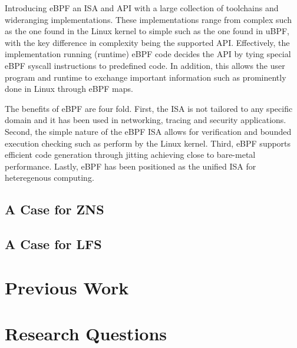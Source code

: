 \documentclass[conference]{IEEEtran}
\begin{document}
Introducing eBPF an ISA and API with a large collection of toolchains and
wideranging implementations\cite{what-ebpf, McCanne1993TheBP}. These
implementations range from complex such as the one found in the Linux kernel to
simple such as the one found in uBPF\cite{ubpf}, with the key difference in
complexity being the supported API. Effectively, the implementation running
(runtime) eBPF code decides the API by tying special eBPF syscall instructions
to predefined code. In addition, this allows the user program and runtime to
exchange important information such as prominently done in Linux through eBPF
maps\cite{bpf-man}.

The benefits of eBPF are four fold. First, the ISA is not tailored to any
specific domain and it has been used in networking\cite{xdp},
tracing\cite{enhanced-ebpf} and security\cite{seccomp} applications. Second,
the simple nature of the eBPF ISA allows for verification and bounded execution
checking such as perform by the Linux kernel\cite{kern-analysis}. Third, eBPF
supports efficient code generation through jitting achieving close to bare-metal
performance. Lastly, eBPF has been positioned as the unified ISA for
heteregenous computing\cite{Brunella2020hXDPES, bpf-uapi}.

\subsection*{A Case for ZNS}

\subsection*{A Case for LFS}

\section{Previous Work}




\section{Research Questions}
\end{document}
